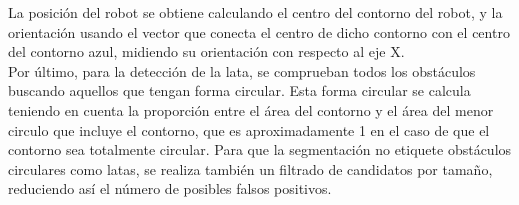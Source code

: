 La posición del robot se obtiene calculando el centro del contorno del robot, y la orientación usando el vector que conecta el centro de dicho contorno con el centro del contorno azul, midiendo su orientación con respecto al eje X.\\

Por último, para la detección de la lata, se comprueban todos los obstáculos buscando aquellos que tengan forma circular. Esta forma circular se calcula teniendo en cuenta la proporción entre el área del contorno y el área del menor circulo que incluye el contorno, que es aproximadamente 1 en el caso de que el contorno sea totalmente circular. Para que la segmentación no etiquete obstáculos circulares como latas, se realiza también un filtrado de candidatos por tamaño, reduciendo así el número de posibles falsos positivos.\\